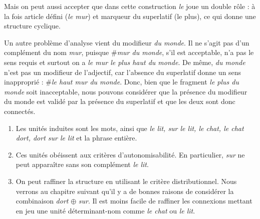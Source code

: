 {\begin{enumerate}[label=\alph*.]
Mais on peut aussi accepter que dans cette construction \textit{le} joue un double rôle : à la fois article défini (\textit{le mur}) et marqueur du superlatif (le plus), ce qui donne une structure cyclique.

\hfill{}\hfill{}



Un autre problème d’analyse vient du modifieur \textit{du monde}. Il ne s’agit pas d’un complément du nom \textit{mur}, puisque \#\textit{mur du monde}, s’il est acceptable, n’a pas le sens requis et surtout on a \textit{le mur le plus haut du monde}. De même, \textit{du monde} n’est pas un modifieur de l’adjectif, car l’absence du superlatif donne un sens inapproprié : \#\textit{le haut mur du monde}. Donc, bien que le fragment \textit{le plus du monde} soit inacceptable, nous pouvons considérer que la présence du modifieur du monde est validé par la présence du superlatif et que les deux sont donc connectés.
\end{enumerate}

\begin{enumerate}[label=\alph*.]
\item Les unités induites sont les mots, ainsi que \textit{le lit, sur le lit, le chat, le chat dort, dort sur le lit} et la phrase entière.
\item Ces unités obéissent aux critères d’autonomisabilité. En particulier, \textit{sur} ne peut apparaître sans son complément \textit{le lit}.
\item On peut raffiner la structure en utilisant le critère distributionnel. Nous verrons au chapitre suivant qu’il y a de bonnes raisons de considérer la combinaison \textit{dort} \textrm{${\oplus}$} \textit{sur}. Il est moins facile de raffiner les connexions mettant en jeu une unité déterminant-nom comme \textit{le chat} ou \textit{le lit}.
\end{enumerate}}
